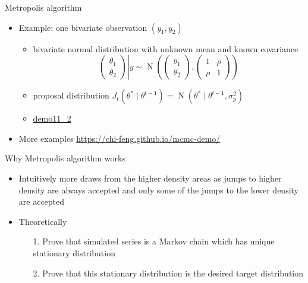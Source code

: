 \documentclass[finnish,english,t]{beamer}
\DeclareMathOperator{\N}{N}
\begin{document}
\begin{frame}{Metropolis algorithm}

  \begin{itemize}
  \item Example: one bivariate observation $(y_1,y_2)$
    \begin{itemize}
    \item bivariate normal distribution with unknown mean and known
      covariance
       \begin{equation*}
         \left.
         \begin{pmatrix}
           \theta_1\\
           \theta_2
         \end{pmatrix}
         \right|  y \sim
         \N\left(
           \begin{pmatrix}
             y_1\\
             y_2
           \end{pmatrix},
           \begin{pmatrix}
             1 & \rho\\
             \rho & 1
         \end{pmatrix}
       \right)
       \end{equation*}
     \item proposal distribution
       $J_t(\theta^{*} \mid \theta^{t-1})=\N(\theta^{*} \mid \theta^{t-1},\sigma_p^2)$
     \item \href{https://avehtari.github.io/BDA_R_demos/demos_ch11/demo11_2.html}{demo11\_2}
     \end{itemize}
   \item<2-> More examples {\small \url{https://chi-feng.github.io/mcmc-demo/}}
   \end{itemize}

\end{frame}

 \begin{frame}{Why Metropolis algorithm works}

  \begin{itemize}
  \item Intuitively more draws from the higher density areas as
    jumps to higher density are always accepted and only some of the
    jumps to the lower density are accepted
    \vspace{5mm}
    \pause
  \item Theoretically
    \begin{itemize}
    \item[1.] Prove that simulated series is a Markov chain
      which has unique stationary distribution
    \item[2.] Prove that this stationary distribution is the desired target distribution
    \end{itemize}
\end{itemize}

\end{frame}
\end{document}
